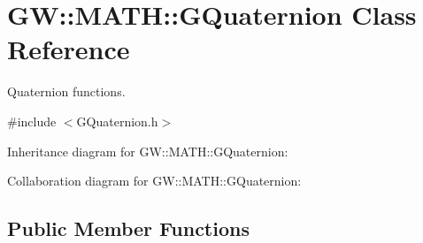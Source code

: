 \hypertarget{classGW_1_1MATH_1_1GQuaternion}{}\section{GW\+::M\+A\+TH\+::G\+Quaternion Class Reference}
\label{classGW_1_1MATH_1_1GQuaternion}


Quaternion functions.  




{\ttfamily \#include $<$G\+Quaternion.\+h$>$}



Inheritance diagram for GW\+::M\+A\+TH\+::G\+Quaternion\+:


Collaboration diagram for GW\+::M\+A\+TH\+::G\+Quaternion\+:
\subsection*{Public Member Functions}
